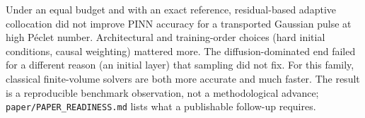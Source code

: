Under an equal budget and with an exact reference, residual-based adaptive collocation did not improve PINN
accuracy for a transported Gaussian pulse at high P\'eclet number. Architectural and training-order choices
(hard initial conditions, causal weighting) mattered more. The diffusion-dominated end failed for a different
reason (an initial layer) that sampling did not fix. For this family, classical finite-volume solvers are both
more accurate and much faster. The result is a reproducible benchmark observation, not a methodological
advance; \texttt{paper/PAPER\_READINESS.md} lists what a publishable follow-up requires.
